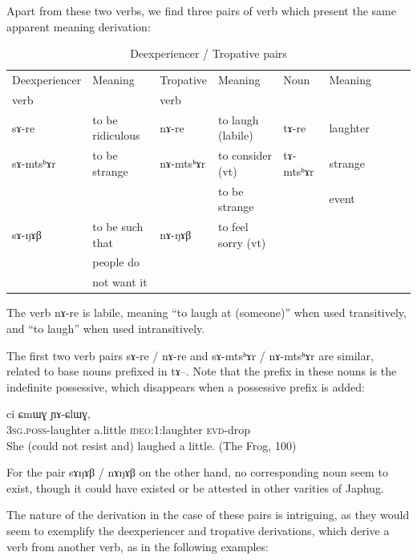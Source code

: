 \documentclass[oldfontcommands,oneside,a4paper,11pt]{article}
\newcommand{\ipa}[1]{{\phon #1}} %
\newcommand{\evd}{\textsc{evd}}
\newcommand{\poss}{\textsc{poss}}
\newcommand{\sg}{\textsc{sg}}
\begin{document}
Apart from these two verbs, we find three pairs of verb which present the same apparent meaning derivation: 

\begin{table}[H]
\caption{Deexperiencer / Tropative pairs } 
\begin{tabular}{lllllllll} \toprule
 
Deexperiencer 	&Meaning	&Tropative 	&Meaning &Noun	&Meaning\\

verb && verb\\
\midrule
\ipa{sɤ-re}  &	to be ridiculous 	& \ipa{nɤ-re}  &	  to laugh (labile) &\ipa{tɤ-re}  &	  laughter\\
\ipa{sɤ-mtsʰɤr}  &	to be strange 	& \ipa{nɤ-mtsʰɤr}  &	  to consider (vt)  &\ipa{tɤ-mtsʰɤr}  &	 strange\\

&&& to be strange && event \\
\ipa{sɤ-ŋɤβ}  &	to be such that   	& \ipa{nɤ-ŋɤβ}  &	  to feel sorry  (vt) & \\
& people do \\
&not want it  \\
\bottomrule
\end{tabular}
\end{table}
The verb  \ipa{nɤ-re} is labile, meaning ``to laugh at (someone)'' when used transitively, and ``to laugh'' when used intransitively.

The first two verb pairs \ipa{sɤ-re} / \ipa{nɤ-re} and  \ipa{sɤ-mtsʰɤr} / \ipa{nɤ-mtsʰɤr} are similar, related to base nouns prefixed in \ipa{tɤ}--. Note that the prefix in these nouns is the indefinite possessive, which disappears when a possessive prefix is added:
 \begin{exe}
\ex
\gll  \ipa{ɯ-re} 	\ipa{ci} 	\ipa{ɕmɯɣ} 	\ipa{ɲɤ-ɕlɯɣ,}   \\
 3\sg{}.\poss{}-laughter a.little   \textsc{ideo}:1:laughter \evd{}-drop \\
 \glt She (could not resist and) laughed a little.  (The Frog, 100)
\end{exe}   

For the pair \ipa{sɤŋɤβ} / \ipa{nɤŋɤβ} on the other hand, no corresponding noun seem to exist, though it could have existed or be attested in other varities of Japhug.

  
The nature of the derivation in the case of these pairs is intriguing, as they would seem to exemplify the deexperiencer and tropative derivations, which derive a verb from another verb, as in the following examples:
\end{document}
